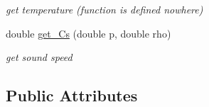\begin{CompactItemize}
\begin{CompactList}\small\item\em get temperature (function is defined nowhere) \item\end{CompactList}\item 
\hypertarget{classMaterial_ad32f778be3001bd9d359beb8c071106}{
double \hyperlink{classMaterial_ad32f778be3001bd9d359beb8c071106}{get\_\-Cs} (double p, double rho)}
\label{classMaterial_ad32f778be3001bd9d359beb8c071106}

\begin{CompactList}\small\item\em get sound speed \item\end{CompactList}\end{CompactItemize}
\subsection*{Public Attributes}
